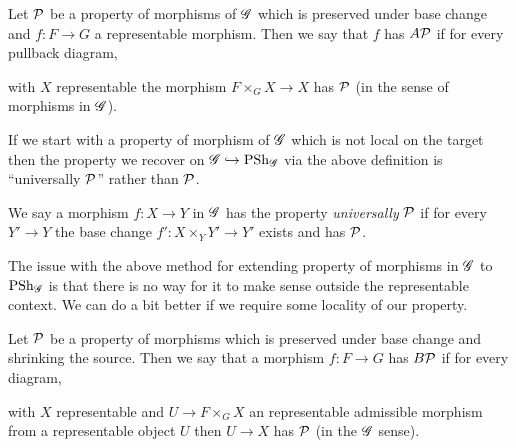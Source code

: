 \documentclass[12pt]{article}
\begin{document}
\begin{defn}
Let $\mathcal{P}$ be a property of morphisms of $\mathscr{G}$ which is preserved under base change and $f : F \to G$ a representable morphism. Then we say that $f$ has $A\mathcal{P}$ if for every pullback diagram,
\begin{center}
\end{center}
with $X$ representable the morphism $F \times_G X \to X$ has $\mathcal{P}$ (in the sense of morphisms in $\mathscr{G}$).
\end{defn}

\begin{rmk}
If we start with a property of morphism of $\mathscr{G}$ which is not local on the target then the property we recover on $\mathscr{G} \hookrightarrow \mathrm{PSh}_{\mathscr{G}}$ via the above definition is ``universally $\mathcal{P}$'' rather than $\mathcal{P}$. 
\end{rmk}

\begin{defn}
We say a morphism $f : X \to Y$ in $\mathscr{G}$ has the property \textit{universally} $\mathcal{P}$ if for every $Y' \to Y$ the base change $f' : X \times_Y Y' \to Y'$ exists and has $\mathcal{P}$.
\end{defn}

\begin{rmk}
The issue with the above method for extending property of morphisms in $\mathscr{G}$ to $\mathrm{PSh}_{\mathscr{G}}$ is that there is no way for it to make sense outside the representable context. We can do a bit better if we require some locality of our property. 
\end{rmk}

\begin{defn}
Let $\mathcal{P}$ be a property of morphisms which is preserved under base change and shrinking the source. Then we say that a morphism $f : F \to G$ has $B\mathcal{P}$ if for every diagram,
\begin{center}
\end{center}
with $X$ representable and $U \to F \times_G X$ an representable admissible morphism from a representable object $U$ then $U \to X$ has $\mathcal{P}$ (in the $\mathscr{G}$ sense).
\end{defn}
\end{document}
